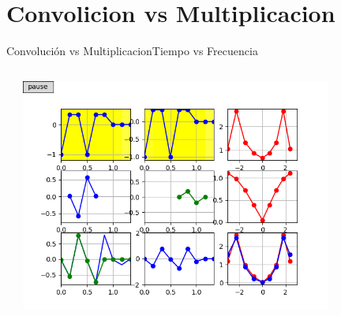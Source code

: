 \section{Convolicion vs Multiplicacion}
\begin{frame}{Convolución vs Multiplicacion}{Tiempo vs Frecuencia}
   \begin{columns}[c]
      \hspace{5pt}
      \begin{column}{.4\textwidth}
      \end{column}
      \hspace{2pt}
      \vrule
      \hspace{2pt}
      \begin{column}{.6\textwidth}
         \centering\includegraphics[width=0.8\textwidth]{5_clase/conv_vs_dft1}
      \end{column}
      \hspace{2pt}
   \end{columns}
   \vfill
\end{frame}
